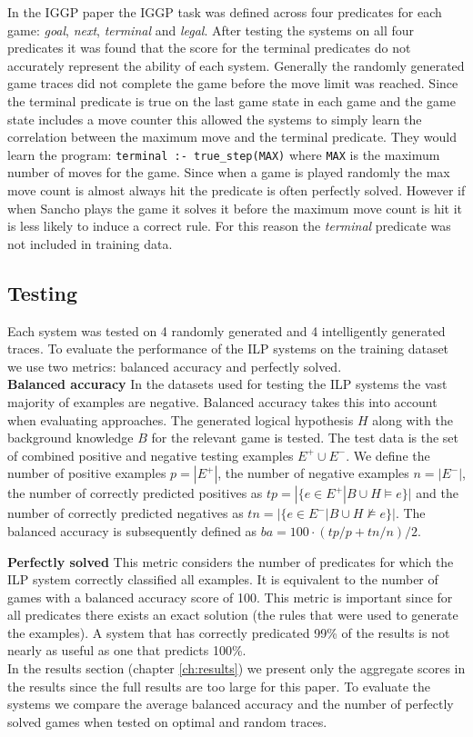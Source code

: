 In the IGGP paper \cite{Cropper/IGGP} the IGGP task was defined across four predicates for each game: \textit{goal}, \textit{next}, \textit{terminal} and \textit{legal}. After testing the systems on all four predicates it was found that the score for the terminal predicates do not accurately represent the ability of each system. Generally the randomly generated game traces did not complete the game before the move limit was reached. Since the terminal predicate is true on the last game state in each game and the game state includes a move counter this allowed the systems to simply learn the correlation between the maximum move and the terminal predicate. They would learn the program: \verb|terminal :- true_step(MAX)| where \verb|MAX| is the maximum number of moves for the game. Since when a game is played randomly the max move count is almost always hit the predicate is often perfectly solved. However if when Sancho plays the game it solves it before the maximum move count is hit it is less likely to induce a correct rule. For this reason the \textit{terminal} predicate was not included in training data.

\subsection{Testing}

Each system was tested on 4 randomly generated and 4 intelligently generated traces. To evaluate the performance of the ILP systems on the training dataset we use two metrics: balanced accuracy and perfectly solved.
\\

\textbf{Balanced accuracy} In the datasets used for testing the ILP systems the vast majority of examples are negative. Balanced accuracy takes this into account when evaluating approaches. The generated logical hypothesis $H$ along with the background knowledge $B$ for the relevant game is tested. The test data is the set of combined positive and negative testing examples $E^+ \cup E^-$. We define the number of positive examples $p = |E^+|$, the number of negative examples $n = |E^-|$, the number of correctly predicted positives as $tp = |\{e\in E^+|B\cup H \models e\}|$ and the number of correctly predicted negatives as $tn = |\{e\in E^-|B\cup H \not\models e\}|$. The balanced accuracy is subsequently defined as $ba = 100 \cdot (tp/p + tn/n)/2$.

\textbf{Perfectly solved} This metric considers the number of predicates for which the ILP system correctly classified all examples. It is equivalent to the number of games with a balanced accuracy score of 100. This metric is important since for all predicates there exists an exact solution (the rules that were used to generate the examples). A system that has correctly predicated 99\% of the results is not nearly as useful as one that predicts 100\%.
\\

In the results section (chapter \ref{ch:results}) we present only the aggregate scores in the results since the full results are too large for this paper. To evaluate the systems we compare the average balanced accuracy and the number of perfectly solved games when tested on optimal and random traces.


